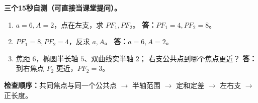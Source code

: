 \clearpage
\begin{trapbox}
\textbf{三个15秒自测（可直接当课堂提问）。}
\begin{enumerate}
\item $a=6,A=2$，点在左支，求 $PF_1,PF_2$。
\textbf{答：}$PF_1=4,PF_2=8$。
\item $PF_1=8,PF_2=4$，反求 $a,A$。
\textbf{答：}$a=6,A=2$。
\item 焦距 $6$，椭圆半长轴 $5$、双曲线实半轴 $2$；
右支公共点到哪个焦点更近？
\textbf{答：}到右焦点 $F_2$ 更近，$PF_2=3$。
\end{enumerate}
\textbf{检查顺序：}共同焦点与同一个公共点 $\to$ 半轴范围
$\to$ 定和定差 $\to$ 左右支 $\to$ 正长度。
\end{trapbox}
